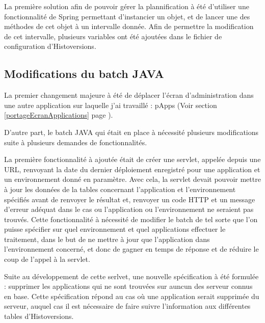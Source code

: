 \documentclass[12pt]{report}
\newcommand{\reference}[1]{(Voir section \ref{#1} page \pageref{#1})}
\begin{document}
    La première solution afin de pouvoir gérer la plannification à été d'utiliser une fonctionnalité de Spring permettant d'instancier un objet, et de lancer une des méthodes de cet objet à un intervalle donnée. Afin de permettre la modification de cet intervalle, plusieurs variables ont été ajoutées dans le fichier de configuration d'Histoversions.
    
    \subsection{Modifications du batch JAVA}

    La premier changement majeure à été de déplacer l'écran d'administration dans une autre application sur laquelle j'ai travaillé : pApps \reference{portageEcranApplications}.
    
    D'autre part, le batch JAVA qui était en place à nécessité plusieurs modifications suite à plusieurs demandes de fonctionnalités.
    
    La première fonctionnalité à ajoutée était de créer une servlet, appelée depuis une URL, renvoyant la date du dernier déploiement enregistré pour une application et un environnement donné en paramètre. Avec cela, la servlet devait pouvoir mettre à jour les données de la tables concernant l'application et l'environnement spécifiés avant de renvoyer le résultat et, renvoyer un code HTTP et un message d'erreur adéquat dans le cas ou l'application ou l'environnement ne seraient pas trouvés. Cette fonctionnalité à nécessité de modifier le batch de tel sorte que l'on puisse spécifier sur quel environnement et quel applications effectuer le traitement, dans le but de ne mettre à jour que l'application dans l'environnement concerné, et donc de gagner en temps de réponse et de réduire le coup de l'appel à la servlet.
    
    Suite au développement de cette serlvet, une nouvelle spécification à été formulée : supprimer les applications qui ne sont trouvées sur auncun des serveur connus en base. Cette spécification répond au cas où une application serait supprimée du serveur, auquel cas il est nécessaire de faire suivre l'information aux différentes tables d'Histoversions.
    
    \newpage
    
\end{document}
